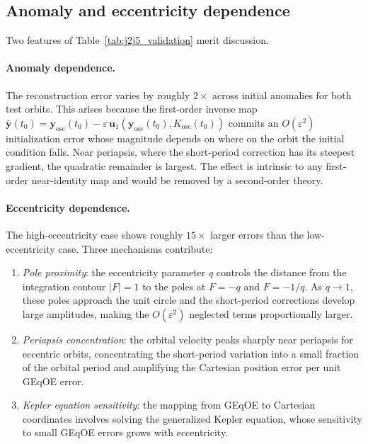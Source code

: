 \documentclass[11pt]{article}
\begin{document}
\subsection{Anomaly and eccentricity dependence}

Two features of Table~\ref{tab:j2j5_validation} merit discussion.

\paragraph{Anomaly dependence.}
The reconstruction error varies by roughly $2\times$ across initial anomalies
for both test orbits. This arises because the first-order inverse map
$\bar{\bm{y}}(t_0) = \bm{y}_{\mathrm{osc}}(t_0)
- \varepsilon\,\bm{u}_1(\bm{y}_{\mathrm{osc}}(t_0),K_{\mathrm{osc}}(t_0))$
commits an $O(\varepsilon^2)$ initialization error whose magnitude depends on
where on the orbit the initial condition falls. Near periapsis, where the
short-period correction has its steepest gradient, the quadratic remainder is
largest. The effect is intrinsic to any first-order near-identity map and
would be removed by a second-order theory.

\paragraph{Eccentricity dependence.}
The high-eccentricity case shows roughly $15\times$ larger errors than the
low-eccentricity case. Three mechanisms contribute:
\begin{enumerate}
    \item \emph{Pole proximity}: the eccentricity parameter $q$ controls the
    distance from the integration contour $|F| = 1$ to the poles at
    $F = -q$ and $F = -1/q$. As $q \to 1$, these poles approach the unit
    circle and the short-period corrections develop large amplitudes,
    making the $O(\varepsilon^2)$ neglected terms proportionally larger.
    \item \emph{Periapsis concentration}: the orbital velocity peaks sharply
    near periapsis for eccentric orbits, concentrating the short-period
    variation into a small fraction of the orbital period and amplifying
    the Cartesian position error per unit GEqOE error.
    \item \emph{Kepler equation sensitivity}: the mapping from GEqOE to
    Cartesian coordinates involves solving the generalized Kepler equation,
    whose sensitivity to small GEqOE errors grows with eccentricity.
\end{enumerate}
\end{document}
